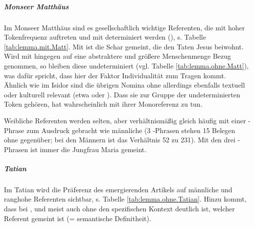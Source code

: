 
\subparagraph{Monseer Matthäus}

Im Monseer Matthäus sind es gesellschaftlich wichtige Referenten, die mit hoher Tokenfrequenz auftreten und mit  determiniert werden (), s. Tabelle \ref{tab:lemma.mit.Matt}. Mit  ist die Schar gemeint, die den Taten Jesus beiwohnt. Wird mit  hingegen auf eine abstraktere und größere Menschenmenge Bezug genommen, so bleiben diese undeterminiert (vgl. Tabelle \ref{tab:lemma.ohne.Matt}), was dafür spricht, dass hier der Faktor Individualität zum Tragen kommt. Ähnlich wie im Isidor sind die übrigen Nomina ohne  allerdings ebenfalls textuell  oder kulturell  relevant (etwa  oder ).  Dass sie zur Gruppe der undeterminierten Token gehören, hat wahrscheinlich mit ihrer Monoreferenz zu tun. 


Weibliche Referenten werden selten, aber verhältnismäßig gleich häufig mit einer -Phrase zum Ausdruck gebracht wie männliche (3 -Phrasen stehen 15 Belegen ohne  gegenüber; bei den Männern ist das Verhältnis 52 zu 231). Mit den drei -Phrasen ist immer die Jungfrau Maria gemeint. 

\subparagraph{Tatian}

Im Tatian wird die Präferenz des emergierenden Artikels auf männliche und ranghohe Referenten  sichtbar, s. Tabelle \ref{tab:lemma.ohne.Tatian}. Hinzu kommt, dass bei ,  und  meist auch ohne den spezifischen Kontext deutlich ist, welcher Referent gemeint ist (= semantische Definitheit).


